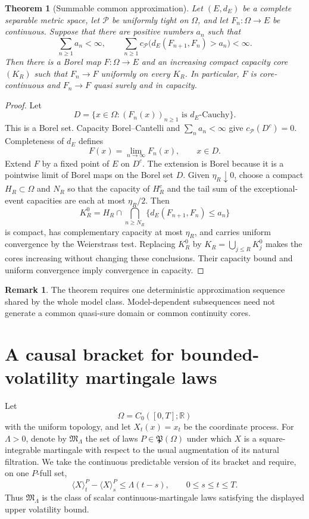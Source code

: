 \documentclass[11pt,reqno]{amsart}
\theoremstyle{plain}
\newtheorem{theorem}{Theorem}[section]
\theoremstyle{definition}
\newtheorem{remark}[remark]{Remark}
\newcommand{\R}{\mathbb R}
\newcommand{\cP}{\mathcal P}
\begin{document}
\begin{theorem}[Summable common approximation]\label{thm:summable-core}
Let \((E,d_E)\) be a complete separable metric space, let \(\cP\) be
uniformly tight on \(\Omega\), and let
\(F_n:\Omega\to E\) be continuous.  Suppose that there are positive numbers
\(a_n\) such that
\[
  \sum_{n\ge1}a_n<\infty,
  \qquad
  \sum_{n\ge1}
  c_{\cP}\bigl(d_E(F_{n+1},F_n)>a_n\bigr)<\infty.
\]
Then there is a Borel map \(F:\Omega\to E\) and an increasing compact
capacity core \((K_R)\) such that \(F_n\to F\) uniformly on every \(K_R\).
In particular, \(F\) is core-continuous and \(F_n\to F\) quasi surely and in
capacity.
\end{theorem}

\begin{proof}
Let
\[
  D=\{x\in\Omega:(F_n(x))_{n\ge1}\text{ is \(d_E\)-Cauchy}\}.
\]
This is a Borel set.  Capacity Borel--Cantelli and
\(\sum_n a_n<\infty\) give \(c_{\cP}(D^c)=0\).  Completeness of \(d_E\)
defines
\[
  F(x)=\lim_{n\to\infty}F_n(x),\qquad x\in D.
\]
Extend \(F\) by a fixed point of \(E\) on \(D^c\).  The extension is Borel
because it is a pointwise limit of Borel maps on the Borel set \(D\).
Given
\(\eta_R\downarrow0\), choose a compact \(H_R\subset\Omega\) and \(N_R\)
so that the capacity of \(H_R^c\) and the tail sum of the exceptional-event
capacities are each at most \(\eta_R/2\).  Then
\[
  K_R^0
  =H_R\cap
  \bigcap_{n\ge N_R}
  \{d_E(F_{n+1},F_n)\le a_n\}
\]
is compact, has complementary capacity at most \(\eta_R\), and carries
uniform convergence by the Weierstrass test.  Replacing \(K_R^0\) by
\(K_R=\bigcup_{j\le R}K_j^0\) makes the cores increasing without changing
these conclusions.  Their capacity bound and uniform convergence imply
convergence in capacity.
\end{proof}

\begin{remark}
The theorem requires one deterministic approximation sequence shared by the
whole model class.  Model-dependent subsequences need not generate a common
quasi-sure domain or common continuity cores.
\end{remark}

\section{A causal bracket for bounded-volatility martingale laws}
\label{sec:bracket}

Let
\[
  \Omega=C_0([0,T];\R)
\]
with the uniform topology, and let \(X_t(x)=x_t\) be the coordinate process.
For \(\Lambda>0\), denote by \(\mathfrak M_\Lambda\) the set of laws
\(P\in\mathfrak P(\Omega)\) under which \(X\) is a square-integrable
martingale with respect to the usual augmentation of its natural filtration.
We take the continuous predictable version of its bracket and require, on
one \(P\)-full set,
\begin{equation}\label{eq:bracket-upper-bound}
  \langle X\rangle_t^P-\langle X\rangle_s^P
  \le\Lambda(t-s),
  \qquad 0\le s\le t\le T.
\end{equation}
Thus \(\mathfrak M_\Lambda\) is the class of scalar continuous-martingale
laws satisfying the displayed upper volatility bound.
\end{document}
